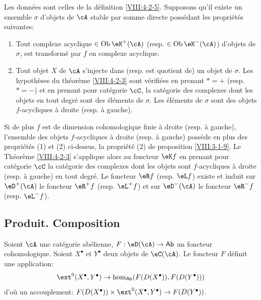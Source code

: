 \begin{corollary}\label{VIII:4-2-3-2} %
Les données sont celles de la définition \ref{VIII:4-2-5}. Supposons qu'il 
existe un ensemble $\sigma$ d'objets de $\cA$ stable par somme directe 
possédant les propriétés suivantes: 
\begin{enumerate}
  \item Tout complexe acyclique $\in \operatorname{Ob}{\eK^+(\cA)}$ (resp. 
    $\in\operatorname{Ob}{\eK^-(\cA)}$) d'objets de $\sigma$, est transformé 
    par $f$ en complexe acyclique. 
  \item Tout objet $X$ de $\cA$ s'injecte dans (resp. est quotient de) un objet 
    de $\sigma$. Les hypothèses du théorème \ref{VIII:4-2-3} sont 
    vérifiées en prenant $\ast=+$ (resp. $\ast=-$) et en prenant pour 
    catégorie $\cC$, la catégorie des complexes dont les objets en tout 
    degré sont des éléments de $\sigma$. Les éléments de $\sigma$ 
    sont des objets $f$-acycliques à droite (resp. à gauche). 
\end{enumerate}

Si de plus $f$ est de dimension cohomologique finie à droite (resp. à 
gauche), l'ensemble des objets $f$-acycliques à droite (resp. à gauche) 
possède en plus des propriétés (1) et (2) ci-dessus, la propriété 
(2) de proposition \ref{VIII:3-1-9}. Le Théorème \ref{VIII:4-2-3} 
s'applique alors au foncteur $\eK f$ en prenant pour catégorie $\cC$ la 
catégorie des complexes dont les objets sont $f$-acycliques à droite 
(resp. à gauche) en tout degré. Le foncteur $\eR f$ (resp. $\eL f$) existe 
et induit sur $\eD^+(\cA)$ le foncteur $\eR^+ f$ (resp. $\eL^+ f$) et sur 
$\eD^-(\cA)$ le foncteur $\eR^- f$ (resp. $\eL^- f$). 
\end{corollary}










\subsection{Produit. Composition}\label{VIII:4-3}

Soient $\cA$ une catégorie abélienne, $F:\eD(\cA) \to \mathsf{Ab}$ un 
foncteur cohomologique. Soient $X^\bullet$ et $Y^\bullet$ deux objets de 
$\eC(\cA)$. Le foncteur $F$ définit une application: 
\[
  \ext^0(X^\bullet,Y^\bullet) \to \hom_{\mathsf{Ab}}(F(D(X^\bullet)),F(D(Y^\bullet)))
\]
d'où un accouplement: 
$F(D(X^\bullet))\times \ext^0(X^\bullet,Y^\bullet) \to F(D(Y^\bullet))$. 

